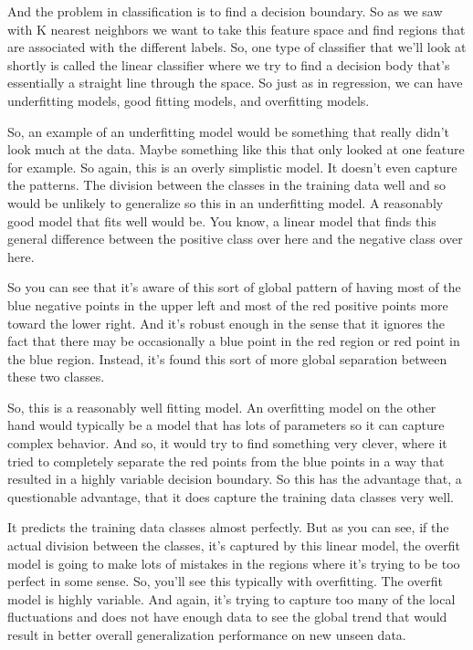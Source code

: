 \begin{multicols}{2}
And the problem in classification is to find a decision boundary. So as we saw with K nearest neighbors we want to take this feature space and find regions that are associated with the different labels. So, one type of classifier that we'll look at shortly is called the linear classifier where we try to find a decision body that's essentially a straight line through the space. So just as in regression, we can have underfitting models, good fitting models, and overfitting models. 

So, an example of an underfitting model would be something that really didn't look much at the data. Maybe something like this that only looked at one feature for example. So again, this is an overly simplistic model. It doesn't even capture the patterns. The division between the classes in the training data well and so would be unlikely to generalize so this in an underfitting model. A reasonably good model that fits well would be. You know, a linear model that finds this general difference between the positive class over here and the negative class over here. 

So you can see that it's aware of this sort of global pattern of having most of the blue negative points in the upper left and most of the red positive points more toward the lower right. And it's robust enough in the sense that it ignores the fact that there may be occasionally a blue point in the red region or red point in the blue region. Instead, it's found this sort of more global separation between these two classes. 

So, this is a reasonably well fitting model. An overfitting model on the other hand would typically be a model that has lots of parameters so it can capture complex behavior. And so, it would try to find something very clever, where it tried to completely separate the red points from the blue points in a way that resulted in a highly variable decision boundary. So this has the advantage that, a questionable advantage, that it does capture the training data classes very well. 

It predicts the training data classes almost perfectly. But as you can see, if the actual division between the classes, it's captured by this linear model, the overfit model is going to make lots of mistakes in the regions where it's trying to be too perfect in some sense. So, you'll see this typically with overfitting. The overfit model is highly variable. And again, it's trying to capture too many of the local fluctuations and does not have enough data to see the global trend that would result in better overall generalization performance on new unseen data. 


\end{multicols}
